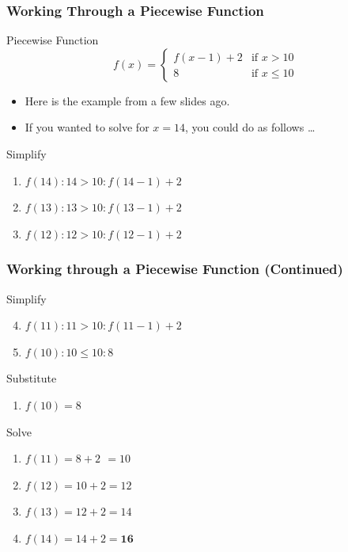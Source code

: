 \documentclass[fleqn, t]{beamer}
\begin{document}
\begin{frame}
  \frametitle{Working Through a Piecewise Function}
  \begin{block}{Piecewise Function}
    \begin{equation*}
      f(x)= 
      \begin{cases}
        f(x - 1) + 2 & \text{if } x > 10 \\
        8 & \text{if } x \leq 10
      \end{cases}
    \end{equation*}
  \end{block}
  \begin{itemize}[<+->]
  \item Here is the example from a few slides ago. 
  \item If you wanted to solve for $x = 14$, you could do as follows \dots
  \end{itemize}
  \begin{block}{Simplify}
    \begin{enumerate}[<+->]
    \item $f(14) : 14 > 10 : f(14 - 1) + 2$
    \item $f(13) : 13 > 10 : f(13 - 1) + 2$
    \item $f(12) : 12 > 10 : f(12 - 1) + 2$
    \end{enumerate}
  \end{block}
\end{frame}

\begin{frame}
  \frametitle{Working through a Piecewise Function (Continued)}
  \begin{block}{Simplify}
  \begin{enumerate}[<+->]
    \setcounter{enumi}{3}
  \item $f(11) : 11 > 10 : f(11 - 1) + 2$
  \item $f(10) : 10 \leq 10 : 8$
  \end{enumerate}
  \end{block}
  \begin{block}{Substitute}
    \begin{enumerate}[<+->]
    \item $f(10) = 8$
    \end{enumerate}
  \end{block}
  \begin{block}{Solve}
    \begin{enumerate}[<+->]
    \item $f(11) = 8 + 2\, \  = 10$
    \item $f(12) = 10 + 2 = 12$
    \item $f(13) = 12 + 2 = 14$
    \item $f(14) = 14 + 2 = \textbf{16}$
    \end{enumerate}
  \end{block}
\end{frame}
\end{document}
